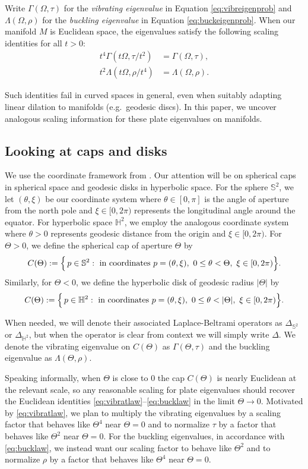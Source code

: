 \documentclass[11pt]{amsart}
\theoremstyle{definition}
\numberwithin{equation}{section}
\newcommand{\lapl}{\Delta}
\renewcommand{\S}{\mathbb{S}}
\renewcommand{\H}{\mathbb{H}}
\begin{document}
Write $\Gamma(\Omega, \tau)$ for the \textit{vibrating eigenvalue} in Equation \eqref{eq:vibreigenprob} and $\Lambda(\Omega, \rho)$ for the \textit{buckling eigenvalue} in Equation \eqref{eq:buckeigenprob}. When our manifold $M$ is Euclidean space, the eigenvalues satisfy the following scaling identities for all $t>0$:
\begin{align}
t^4\Gamma(t\Omega, \tau/t^2) &= \Gamma(\Omega, \tau), \label{eq:vibratlaw} \\
t^2\Lambda(t\Omega, \rho/t^4) &= \Lambda(\Omega, \rho). \label{eq:bucklaw}
\end{align}

Such identities fail in curved spaces in general, even when suitably adapting linear dilation to manifolds (e.g.\ geodesic discs). In this paper, we uncover analogous scaling information for these plate eigenvalues on manifolds.


\subsection*{Looking at caps and disks}

We use the coordinate framework from \cite{H25}. Our attention will be on spherical caps in spherical space and geodesic disks in hyperbolic space. For the sphere $\S^2$, we let $(\theta, \xi)$ be our coordinate system where $\theta \in [0,
\pi]$ is the angle of aperture from the north pole and $\xi \in [0, 2\pi)$ represents the longitudinal angle around the equator. For hyperbolic space $\H^2$, we employ the analogous coordinate system where $\theta > 0$ represents geodesic distance from the origin and $\xi \in [0, 2\pi)$. For $\Theta>0$, we define the spherical cap of aperture $\Theta$ by
\[
C(\Theta):=\Bigl\{\,p\in \mathbb{S}^2:\ \text{in coordinates }p=(\theta,\xi),
\ 0\le \theta<\Theta,\ \xi\in[0,2\pi)\Bigr\}.
\]
Similarly, for $\Theta<0$, we define the hyperbolic disk of geodesic radius $|\Theta|$ by
\[
C(\Theta):=\Bigl\{\,p\in \mathbb{H}^2:\ \text{in coordinates }p=(\theta,\xi),
\ 0\le \theta<|\Theta|,\ \xi\in[0,2\pi)\Bigr\}.
\]

When needed, we will denote their associated Laplace-Beltrami operators as $\lapl_{\S^2}$ or $\lapl_{\H^2}$, but when the operator is clear from context we will simply write $\lapl$. We denote the vibrating eigenvalue on $C(\Theta)$ as $\Gamma(\Theta, \tau)$ and the buckling eigenvalue as $\Lambda(\Theta, \rho)$.

Speaking informally, when $\Theta$ is close to $0$ the cap $C(\Theta)$ is nearly Euclidean at the relevant scale, so any reasonable scaling for plate eigenvalues should recover the Euclidean identities \eqref{eq:vibratlaw}--\eqref{eq:bucklaw} in the limit $\Theta\to 0$. Motivated by \eqref{eq:vibratlaw}, we plan to multiply the vibrating eigenvalues by a scaling factor that behaves like $\Theta^{4}$ near $\Theta=0$ and to normalize $\tau$ by a factor that behaves like $\Theta^{2}$ near $\Theta=0$. For the buckling eigenvalues, in accordance with \eqref{eq:bucklaw}, we instead want our scaling factor to behave like $\Theta^{2}$ and to normalize $\rho$ by a factor that behaves like $\Theta^{4}$ near $\Theta=0$.
\end{document}
